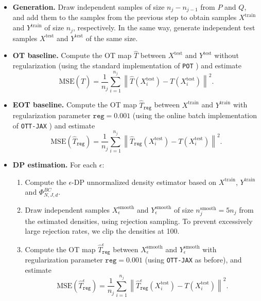 \documentclass{article}
\newcommand{\1}{\mathds{1}}
\theoremstyle{plain}
\theoremstyle{definition}
\theoremstyle{remark}
\begin{document}
\begin{itemize}[leftmargin=1em]
    \item \textbf{Generation.} Draw independent samples of size $n_j - n_{j-1}$ from $P$ and $Q$, and add them to the samples from the previous step to obtain samples $X^{\mathrm{train}}$ and $Y^{\mathrm{train}}$ of size $n_j$, respectively. In the same way, generate independent test samples $X^{\mathrm{test}}$ and $Y^{\mathrm{test}}$ of the same size. 
    


     \item \textbf{OT baseline.} Compute the OT map $\hat T$ between $X^{\mathrm{test}}$ and $Y^{\mathrm{test}}$ without regularization (using the standard implementation of \texttt{POT} \cite{flamary2021pot}) and estimate
    \[
    \mathrm{MSE}(\hat T)
    =
    \frac{1}{n_j}
    \sum_{i=1}^{n_j}
    \left\|
    \hat T(X^{\mathrm{test}}_i)
    -
    T(X^{\mathrm{test}}_i)
    \right\|^2.
    \]
    \item \textbf{EOT baseline.} Compute the OT map $\hat T_{\texttt{reg}}$ between $X^{\mathrm{train}}$ and $Y^{\mathrm{train}}$ with regularization parameter $\texttt{reg} = 0.001$ (using the online batch implementation of \texttt{OTT-JAX} \cite{cuturi2022optimal}) and estimate
    \[
    \mathrm{MSE}(\hat T_{\texttt{reg}})
    =
    \frac{1}{n_j}
    \sum_{i=1}^{n_j}
    \left\|
    \hat T_{\texttt{reg}}(X^{\mathrm{test}}_i)
    -
    T(X^{\mathrm{test}}_i)
    \right\|^2.
    \]

    \item \textbf{DP estimation.} For each $\epsilon$:
    \begin{enumerate}

    \item Compute the $\epsilon$-DP unnormalized density estimator based on $X^{\mathrm{train}}$, $Y^{\mathrm{train}}$ and $\Phi_{N,J,d}^{BC}$.
    
    \item Draw independent samples $X^{\mathrm{smooth}}_\epsilon$ and $Y^{\mathrm{smooth}}_\epsilon$ of size $n_j^{\mathrm{smooth}} = 5 n_j$  from the estimated densities, using rejection sampling. 
    To prevent excessively large rejection rates, we clip the densities at 100. 

    
    \item Compute the OT map $\hat T_{\texttt{reg}}^\epsilon$ between $X^{\mathrm{smooth}}_\epsilon$ and $Y^{\mathrm{smooth}}_\epsilon$ with regularization parameter $\texttt{reg} = 0.001$ (using \texttt{OTT-JAX} as before), and estimate
    \[
    \mathrm{MSE}(\hat T_{\texttt{reg}}^\epsilon)
    =
    \frac{1}{n_j}
    \sum_{i=1}^{n_j}
    \left\|
    \hat T_{\texttt{reg}}^\epsilon(X^{\mathrm{test}}_i)
    -
    T(X^{\mathrm{test}}_i)
    \right\|^2.
    \]
    \end{enumerate}

\end{itemize}
\end{document}
